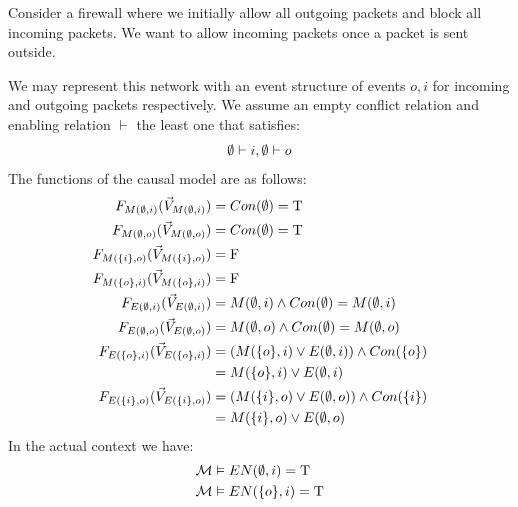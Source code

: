 \begin{example}
    Consider a firewall where we initially allow all outgoing packets and block all incoming packets.
    We want to allow incoming packets once a packet is sent outside.
    \begin{center}
    \end{center}
    We may represent this network with an event structure of
    events $o,i$ for incoming and outgoing packets respectively.
    We assume an empty conflict relation and enabling relation
    $\vdash$ the least one that satisfies:
    \begin{align*}
        \emptyset \vdash i, \emptyset \vdash o
    \end{align*}
    The functions of the causal model are as follows:
    \begin{align*}
        F_{M(\emptyset,i)}(\vec V_{M(\emptyset,i)})    & = Con(\emptyset) = \mathrm{T}                           \\
        F_{M(\emptyset,o)}(\vec V_{M(\emptyset,o)})    & = Con(\emptyset) = \mathrm{T}                           \\
        F_{M(\{i\},o)}(\vec V_{M(\{i\},o)}) & = \mathrm{F}                                     \\
        F_{M(\{o\},i)}(\vec V_{M(\{o\},i)}) & = \mathrm{F}                                     \\
        F_{E(\emptyset,i)}(\vec V_{E(\emptyset,i)})    & = M(\emptyset,i) \wedge Con(\emptyset) = M(\emptyset,i)       \\
        F_{E(\emptyset,o)}(\vec V_{E(\emptyset,o)})    & = M(\emptyset,o) \wedge Con(\emptyset) = M(\emptyset,o)       \\
        F_{E(\{o\},i)}(\vec V_{E(\{o\},i)}) & =
        \left( M(\{o\},i) \vee E(\emptyset,i)  \right) \wedge Con(\{o\}) \\
                       & = M(\{o\},i) \vee E(\emptyset,i)                \\
        F_{E(\{i\},o)}(\vec V_{E(\{i\},o)}) & =
        \left( M(\{i\},o) \vee E(\emptyset,o) \right)
        \wedge Con(\{i\})                                         \\
                       & = M(\{i\},o) \vee E(\emptyset,o)                \\
    \end{align*}
    In the actual context we have:
    \begin{align*}
        \m & \vDash EN(\e,i) = \T    \\
        \m & \vDash EN(\s{o},i) = \T \\

\end{align*}
\end{example}
